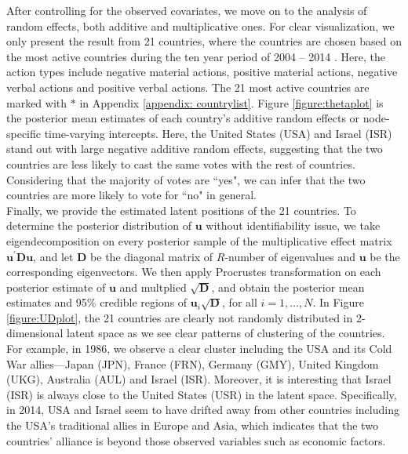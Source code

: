 \documentclass[a4paper]{article}
\begin{document}
 \newline\noindent After controlling for the observed covariates, we move on to the analysis of random effects, both additive and multiplicative ones. For clear visualization, we only present the result from 21 countries, where the countries are chosen based on the most active countries during the ten year period of 2004 -- 2014 \citep{hoff2015multilinear}. Here, the action types include negative material actions, positive material actions, negative verbal actions and positive verbal actions. The 21 most active countries are marked with $*$ in Appendix \ref{appendix: countrylist}. Figure \ref{figure:thetaplot} is the posterior mean estimates of each country's additive random effects or node-specific time-varying intercepts. Here, the United States (USA) and Israel (ISR) stand out with large negative additive random effects, suggesting that the two countries are less likely to cast the same votes with the rest of countries. Considering that the majority of votes are ``yes", we can infer that the two countries are more likely to vote for ``no" in general.\\ \newline
Finally, we provide the estimated latent positions of the 21 countries. To determine the posterior distribution of $\boldsymbol{u}$ without identifiability issue, we take eigendecomposition on every posterior sample of the multiplicative effect matrix $\boldsymbol{u}^\prime \mathbf{D}\boldsymbol{u}$, and let $\mathbf{D}$ be the diagonal matrix of $R$-number of eigenvalues and $\boldsymbol{u}$ be the corresponding eigenvectors. We then apply Procrustes transformation on each posterior estimate of $\boldsymbol{u}$ and multplied $\sqrt{\mathbf{D}}$, and obtain the posterior mean estimates and 95\% credible regions of $\boldsymbol{u}_i\sqrt{\mathbf{D}}$, for all $i=1,\ldots, N$. In Figure \ref{figure:UDplot}, the 21 countries are clearly not randomly distributed in 2-dimensional latent space as we see clear patterns of clustering of the countries. For example, in 1986, we observe a clear cluster including the USA and its Cold War allies---Japan (JPN), France (FRN), Germany (GMY), United Kingdom (UKG), Australia (AUL) and Israel (ISR). Moreover, it is interesting that Israel (ISR) is always close to the United States (USR) in the latent space. Specifically, in 2014, USA and Israel seem to have drifted away from other countries including the USA's traditional allies in Europe and Asia, which indicates that the two countries' alliance is beyond those observed variables such as economic factors.
\end{document}

